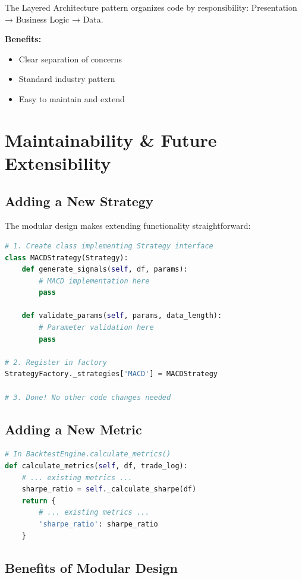 \documentclass[11pt,a4paper]{article}
\begin{document}
The Layered Architecture pattern organizes code by responsibility: Presentation → Business Logic → Data.

\textbf{Benefits:}
\begin{itemize}[noitemsep]
    \item Clear separation of concerns
    \item Standard industry pattern
    \item Easy to maintain and extend
\end{itemize}

\newpage
\section{Maintainability \& Future Extensibility}

\subsection{Adding a New Strategy}

The modular design makes extending functionality straightforward:

\begin{lstlisting}[language=Python, caption=Adding a New Strategy]
# 1. Create class implementing Strategy interface
class MACDStrategy(Strategy):
    def generate_signals(self, df, params):
        # MACD implementation here
        pass
    
    def validate_params(self, params, data_length):
        # Parameter validation here
        pass

# 2. Register in factory
StrategyFactory._strategies['MACD'] = MACDStrategy

# 3. Done! No other code changes needed
\end{lstlisting}

\subsection{Adding a New Metric}

\begin{lstlisting}[language=Python, caption=Adding a New Metric]
# In BacktestEngine.calculate_metrics()
def calculate_metrics(self, df, trade_log):
    # ... existing metrics ...
    sharpe_ratio = self._calculate_sharpe(df)
    return {
        # ... existing metrics ...
        'sharpe_ratio': sharpe_ratio
    }
\end{lstlisting}

\subsection{Benefits of Modular Design}
\end{document}
